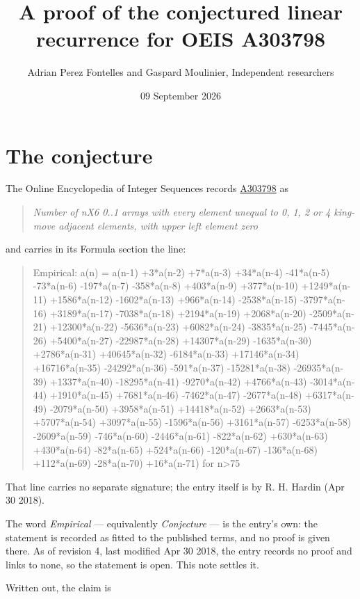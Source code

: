 \documentclass[11pt]{article}
\title{A proof of the conjectured linear recurrence for OEIS A303798}
\author{Adrian Perez Fontelles and Gaspard Moulinier, Independent researchers}
\date{09 September 2026}
\theoremstyle{definition}
\begin{document}
\maketitle
\section{The conjecture}

The Online Encyclopedia of Integer Sequences records \href{https://oeis.org/A303798}{A303798} as

\begin{quote}\itshape Number of nX6 0..1 arrays with every element unequal to 0, 1, 2 or 4 king-move adjacent elements, with upper left element zero\end{quote}

and carries in its Formula section the line:

\begin{quote}\ttfamily Empirical: a(n) = a(n-1) +3*a(n-2) +7*a(n-3) +34*a(n-4) -41*a(n-5) -73*a(n-6) -197*a(n-7) -358*a(n-8) +403*a(n-9) +377*a(n-10) +1249*a(n-11) +1586*a(n-12) -1602*a(n-13) +966*a(n-14) -2538*a(n-15) -3797*a(n-16) +3189*a(n-17) -7038*a(n-18) +2194*a(n-19) +2068*a(n-20) -2509*a(n-21) +12300*a(n-22) -5636*a(n-23) +6082*a(n-24) -3835*a(n-25) -7445*a(n-26) +5400*a(n-27) -22987*a(n-28) +14307*a(n-29) -1635*a(n-30) +2786*a(n-31) +40645*a(n-32) -6184*a(n-33) +17146*a(n-34) +16716*a(n-35) -24292*a(n-36) -591*a(n-37) -15281*a(n-38) -26935*a(n-39) +1337*a(n-40) -18295*a(n-41) -9270*a(n-42) +4766*a(n-43) -3014*a(n-44) +1910*a(n-45) +7681*a(n-46) -7462*a(n-47) -2677*a(n-48) +6317*a(n-49) -2079*a(n-50) +3958*a(n-51) +14418*a(n-52) +2663*a(n-53) +5707*a(n-54) +3097*a(n-55) -1596*a(n-56) +3161*a(n-57) -6253*a(n-58) -2609*a(n-59) -746*a(n-60) -2446*a(n-61) -822*a(n-62) +630*a(n-63) +430*a(n-64) -82*a(n-65) +524*a(n-66) -120*a(n-67) -136*a(n-68) +112*a(n-69) -28*a(n-70) +16*a(n-71) for n>75\end{quote}

That line carries no separate signature; the entry itself is by R. H. Hardin (Apr 30 2018).

The word {\itshape Empirical} --- equivalently {\itshape Conjecture} --- is the entry's own: the statement is recorded as fitted to the published terms, and no proof is given there. As of revision 4, last modified Apr 30 2018, the entry records no proof and links to none, so the statement is open. This note settles it.

Written out, the claim is
\end{document}
